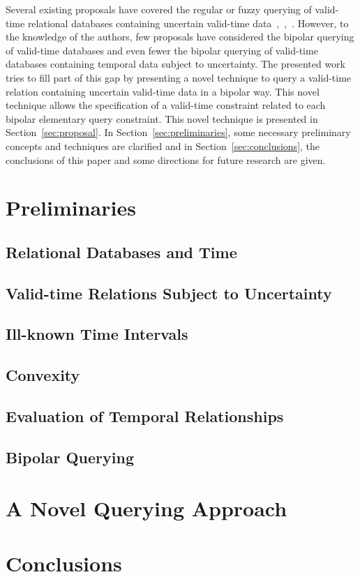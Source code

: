 \documentclass[runningheads,a4paper]{llncs}
\begin{document}
Several existing proposals have covered the regular or fuzzy querying of valid-time relational databases containing uncertain valid-time da\-ta~\cite{Pons2012ijcis},~\cite{Pons2012ipmu},~\cite{Pons2013ijufkbs}. However, to the knowledge of the authors, few proposals have considered the bipolar querying of valid-time databases and even fewer the bipolar querying of valid-time databases containing temporal data subject to uncertainty. The presented work tries to fill part of this gap by presenting a novel technique to query a valid-time relation containing uncertain valid-time data in a bipolar way. This novel technique allows the specification of a valid-time constraint related to each bipolar elementary query constraint. This novel technique is presented in Section~\ref{sec:proposal}. In Section~\ref{sec:preliminaries}, some necessary preliminary concepts and techniques are clarified and in Section~\ref{sec:conclusions}, the conclusions of this paper and some directions for future research are given.


\section{Preliminaries}

\subsection{Relational Databases and Time}

\subsection{Valid-time Relations Subject to Uncertainty}

\subsection{Ill-known Time Intervals}

\subsection{Convexity}

\subsection{Evaluation of Temporal Relationships}

\subsection{Bipolar Querying}

\section{A Novel Querying Approach}



\section{Conclusions}




\end{document}
